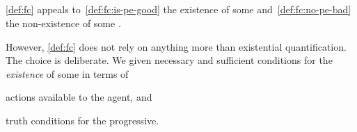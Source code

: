 

\subsection{}
\label{cha:sec:fcs-def:potential-events}

\begin{note}
  \autoref{def:fc} appeals to~\ref{def:fc:is-pe-good} the existence of some \pevent{} and~\ref{def:fc:no-pe-bad} the non-existence of some \pevent{}.

  However, \autoref{def:fc} does not rely on anything more than existential quantification.
  The choice is deliberate.
  We given necessary and sufficient conditions for the \emph{existence} of some \pevent{} in terms of
  \begin{enumerate*}[label=(\roman*)]
  \item
    actions available to the agent, and
  \item
    truth conditions for the progressive.
  \end{enumerate*}
\end{note}

